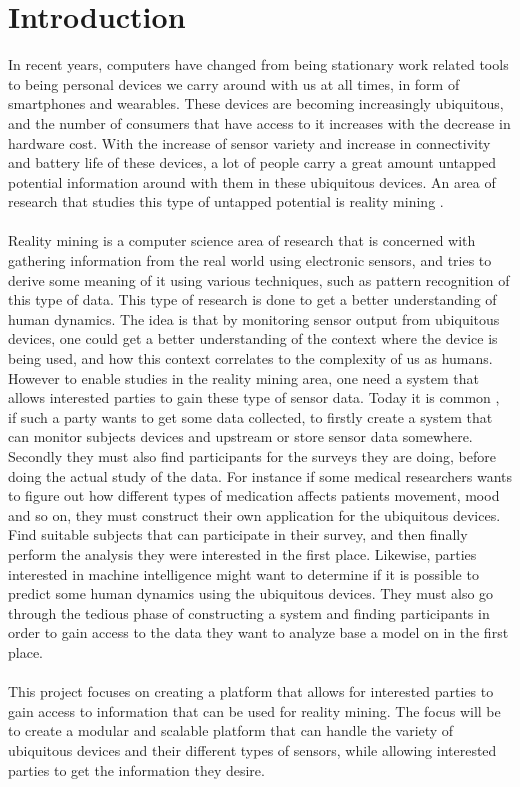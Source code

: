 \chapter{Introduction}
\label{cha:introduction}

In recent years, computers have changed from being stationary work related tools to being personal devices we carry around with us at all times, in form of smartphones and wearables. These devices are becoming increasingly ubiquitous, and the number of consumers that have access to it increases with the decrease in hardware cost. With the increase of sensor variety and increase in connectivity and battery life of these devices, a lot of people carry a great amount untapped potential information around with them in these ubiquitous devices.  An area of research that studies this type of untapped potential is reality mining .
\\\\
Reality mining is a computer science area of research that is concerned with gathering information from the real world using electronic sensors, and tries to derive some meaning of it using various techniques, such as pattern recognition of this type of data. This type of research is done to get a better understanding of human dynamics. The idea is that by monitoring sensor output from ubiquitous devices, one could get a better understanding of the context where the device is being used, and how this context correlates to the complexity of us as humans. However to enable studies in the reality mining area, one need a system that allows interested parties to gain these type of sensor data. Today it is common , if such a party wants to get some data collected, to firstly create a system that can monitor subjects devices and upstream or store sensor data somewhere. Secondly they must also find participants for the surveys they are doing, before doing the actual study of the data. For instance if some medical researchers wants to figure out how different types of medication affects patients movement, mood and so on, they must construct their own application for the ubiquitous devices. Find suitable subjects that can participate in their survey, and then finally perform the analysis they were interested in the first place. Likewise, parties interested in machine intelligence might want to determine if it is possible to predict some human dynamics using the ubiquitous devices. They must also go through the tedious phase of constructing a system and finding participants in order to gain access to the data they want to analyze base a model on in the first place.
\\\\
This project focuses on creating a platform that allows for interested parties to gain access to information that can be used for reality mining. The focus will be to create a modular and scalable platform that can handle the variety of ubiquitous devices and their different types of sensors, while allowing interested parties to get the information they desire.

